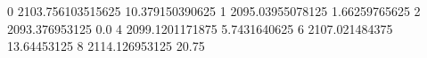 0 2103.756103515625 10.379150390625
1 2095.03955078125 1.66259765625
2 2093.376953125 0.0
4 2099.1201171875 5.7431640625
6 2107.021484375 13.64453125
8 2114.126953125 20.75
